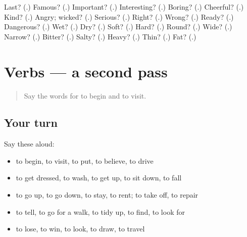 \begin{tcolorbox}[breakable,colback=teal!4,colframe=teal!35!black,title={Before you move on}]
Last? (\textbf{}.) Famous? (\textbf{}.) Important? (\textbf{}.) Interesting? (\textbf{}.) Boring? (\textbf{}.) Cheerful? (\textbf{}.) Kind? (\textbf{}.) Angry; wicked? (\textbf{}.) Serious? (\textbf{}.) Right? (\textbf{}.) Wrong? (\textbf{}.) Ready? (\textbf{}.) Dangerous? (\textbf{}.) Wet? (\textbf{}.) Dry? (\textbf{}.) Soft? (\textbf{}.) Hard? (\textbf{}.) Round? (\textbf{}.) Wide? (\textbf{}.) Narrow? (\textbf{}.) Bitter? (\textbf{}.) Salty? (\textbf{}.) Heavy? (\textbf{}.) Thin? (\textbf{}.) Fat? (\textbf{}.)
\end{tcolorbox}
\section[(dialogue)]{Verbs — a second pass}

\label{lesson:RU-R135-second-pass-verbs}



\begin{quote}
Say the words for to begin and to visit.
\end{quote}

\subsection*{Your turn}
Say these aloud:

\begin{itemize}
\raggedright
  \item to begin, to visit, to put, to believe, to drive
  \item to get dressed, to wash, to get up, to sit down, to fall
  \item to go up, to go down, to stay, to rent; to take off, to repair
  \item to tell, to go for a walk, to tidy up, to find, to look for
  \item to lose, to win, to look, to draw, to travel
\end{itemize}

